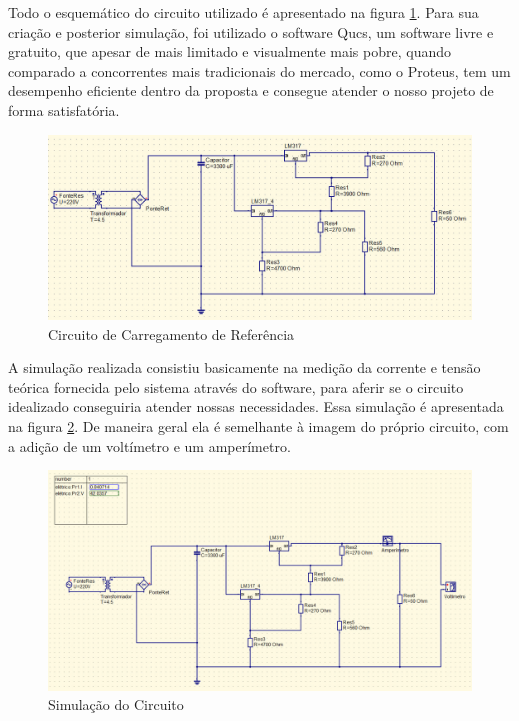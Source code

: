 Todo o esquemático do circuito utilizado é apresentado na figura \ref{referencia}. Para sua criação e posterior simulação, foi utilizado o software Qucs, um software livre e gratuito, que apesar de mais limitado e visualmente mais pobre, quando comparado a concorrentes mais tradicionais do mercado, como o Proteus, tem um desempenho eficiente dentro da proposta e consegue atender o nosso projeto de forma satisfatória.

\graphicspath{{figuras/}}
\begin{figure}[h]
\centering
\includegraphics[scale=0.40]{referencia}
\caption{Circuito de Carregamento de Referência}
\label{referencia}
\end{figure}
 
A simulação realizada consistiu basicamente na medição da corrente e tensão teórica fornecida pelo sistema através do software, para aferir se o circuito idealizado conseguiria atender nossas necessidades. Essa simulação é apresentada na figura \ref{simulacao}. De maneira geral ela é semelhante à imagem do próprio circuito, com a adição de um voltímetro e um amperímetro.

\graphicspath{{figuras/}}
\begin{figure}[h]
\centering
\includegraphics[scale=0.40]{simulacao}
\caption{Simulação do Circuito}
\label{simulacao}
\end{figure}

